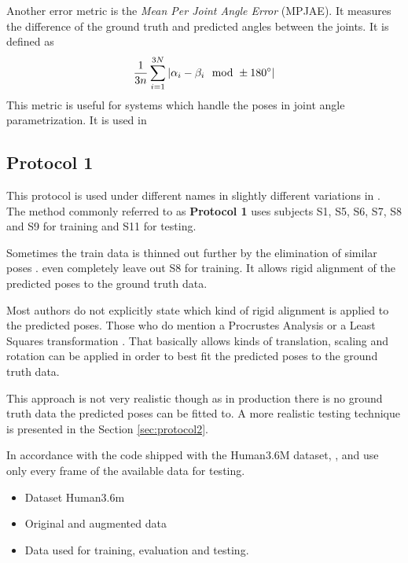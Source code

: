 Another error metric is the \textit{Mean Per Joint Angle Error} (MPJAE). It measures the difference of the ground truth and predicted angles between the joints.
It is defined as
\begin{equation}
	\frac{1}{3n} \sum_{i = 1}^{3N} \abs{\alpha_i - \beta_i \mod \pm 180\degree}
\end{equation}
This metric is useful for systems which handle the poses in joint angle parametrization. It is used in 

\subsection{Protocol 1}

This protocol is used under different names in slightly different variations in \cite{sun17, drover18, moreno-noguer16, yasin16, kostrikov14, tome17}.
The method commonly referred to as \textbf{Protocol 1} uses subjects S1, S5, S6, S7, S8 and S9 for training and S11 for testing.

Sometimes the train data is thinned out further by the elimination of similar poses \cite{yasin16}.
\citet{drover18} even completely leave out S8 for training.
It allows rigid alignment \cite{drover18, yasin16, kostrikov14, sun17, tome17, chen17} of the predicted poses to the ground truth data.


Most authors do not explicitly state which kind of rigid alignment is applied to the predicted poses.
Those who do mention a Procrustes Analysis \cite{sun17, tome17} or a Least Squares transformation \cite{kostrikov14}.
That basically allows kinds of translation, scaling and rotation can be applied in order to best fit the predicted poses to the ground truth data.

This approach is not very realistic though as in production there is no ground truth data the predicted poses can be fitted to.
A more realistic testing technique is presented in the Section \ref{sec:protocol2}.

In accordance with the code shipped with the Human3.6M dataset, \citet{sun17}, \citet{chen17} and \citet{moreno-noguer16} use only every  frame of the available data for testing.



%
\begin{itemize}
	\item Dataset Human3.6m
	\item Original and augmented data
	\item Data used for training, evaluation and testing.
\end{itemize}
